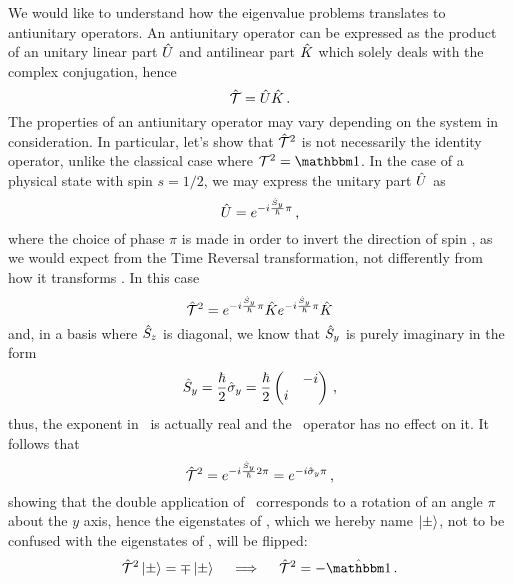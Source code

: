             We would like to understand how the eigenvalue problems translates to antiunitary operators. An antiunitary operator can be expressed \cite{Sakurai2020-pu} as the product of an unitary linear part $\hat{U}$ and antilinear part $\hat{K}$ which solely deals with the complex conjugation, hence
            \begin{equation}
                \label{eq:antiunitary-operator}
                \mathcal{\hat{T}} = \hat{U}\hat{K}
                \,\text{.}
            \end{equation}
            The properties of an antiunitary operator may vary depending on the system in consideration. In particular, let's show that $\mathcal{\hat{T}}^2$ is not necessarily the identity operator, unlike the classical case where $\mcT^2 = \idM$. In the case of a physical state with spin $s = 1/2$, we may express the unitary part $\hat{U}$ as
            \begin{equation*}
                \hat{U} = e^{-i \frac{\hat{S}_y}{\hbar} \pi}
                \,\text{,}
            \end{equation*}
            where the choice of phase $\pi$ is made in order to invert the direction of spin \hvS, as we would expect from the Time Reversal transformation, not differently from how it transforms \hvp. In this case
            \begin{equation*}
                \mathcal{\hat{T}}^2 = e^{-i \frac{\hat{S}_y}{\hbar} \pi} \hat{K} e^{-i \frac{\hat{S}_y}{\hbar} \pi} \hat{K}
            \end{equation*}
            and, in a basis where $\hat{S}_z$ is diagonal, we know that $\hat{S}_y$ is purely imaginary in  the form
            \begin{equation*}
                \hSy
                = \frac{\hbar}{2} \togglehat{\sigma}_y
                = \frac{\hbar}{2} \pmqty{\admat{-i,i}}
                \mycomma
            \end{equation*}
            thus, the exponent in \hU\ is actually real and the \hK\ operator has no effect on it. It follows that
            \begin{equation*}
                \mathcal{\hat{T}}^2
                = e^{-i \frac{\hat{S}_y}{\hbar} 2\pi}
                = e^{-i \hat{\sigma}_y \pi}
                \,\text{,}
            \end{equation*}
            showing that the double application of \hT\ corresponds to a rotation of an angle $\pi$ about the $y$ axis, hence the eigenstates of \hSz, which we hereby name $\ket{\pm}$, not to be confused with the eigenstates of \hP, will be flipped:
            \begin{equation*}
                \hT^2 \ket{\pm} = \mp \ket{\pm}
                \quad\implies\quad
                \hT^2 = -\togglehat{\idM}
                \myperiod
            \end{equation*}

